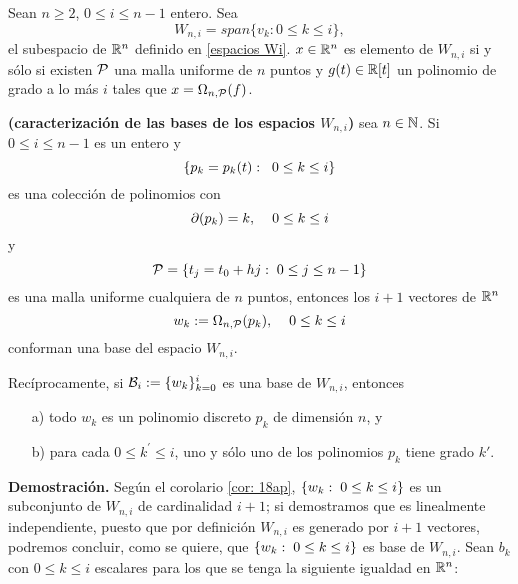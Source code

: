 \begin{cor}
\label{cor: 18ap}
Sean $n\geq 2$, $0 \leq i \leq n-1$ entero. 
Sea
\begin{equation*}
\label{def de espacios Wk}
W_{n,i}= span\{ v_{k} : 0 \leq k \leq i \},
\end{equation*}
el subespacio de $\mathbb{R}^{n}$ 
definido en \eqref{espacios Wi}.
$x \in \mathbb{R}^{n}$ es elemento de $W_{n,i}$ si y sólo si 
existen $\mathcal{P}$ una malla uniforme de $n$ puntos y
$g(t) \in \mathbb{R}[t]$ un polinomio de grado a lo más $i$
tales que 
$x = \Omega_{n, \mathcal{P}}(f)$.
\end{cor}


\begin{prop} \label{Teorema1}
\textbf{(caracterización de las bases
de los espacios $W_{n,i}$)} sea $n \in \mathbb{N}$.
Si $0 \leq i \leq n-1$ es un entero y
\[
\{ p_{k}=p_{k}(t): \hspace{0.2cm} 0 \leq k \leq i \}
\]
es una colección de polinomios con
\[
\partial (p_{k})=k, \hspace{0.4cm} 0 \leq k \leq i
\]
y 
\[
\mathcal{P}= \{ t_{j}= t_{0}+hj :\hspace{0.1cm} 0 \leq j \leq n-1 \}
\]
es una malla uniforme cualquiera
de $n$ puntos, entonces los $i+1$ vectores
de $\mathbb{R}^{n}$
\begin{equation}
\label{eq1: 30Oct}
w_{k} := \Omega_{n, \mathcal{P}}(p_{k}), \hspace{0.4cm} 0 \leq k \leq i
\end{equation}
conforman una base del espacio $W_{n,i}$.

Recíprocamente, si $\mathcal{B}_{i} := \{ w_{k} \}_{k=0}^{i}$
es una base de $W_{n,i}$, entonces 
\begin{itemize}
	\item[a)] todo $w_{k}$ es un polinomio discreto $p_{k}$ de dimensión $n$, y
	\item[b)] para cada $0 \leq k^{'} \leq i$, uno y sólo uno de los polinomios
	$p_{k}$ tiene grado $k'$.
\end{itemize}
\end{prop}
\noindent
\textbf{Demostración.}
Según el corolario \ref{cor: 18ap}, 
$\{ w_{k}: \hspace{0.1cm} 0 \leq k \leq i \}$
es un subconjunto de $W_{n,i}$ de cardinalidad $i+1$; 
si demostramos que es 
linealmente independiente, puesto que por definición
$W_{n,i}$ es generado por $i+1$ vectores, podremos concluir,
como se quiere, que $\{ w_{k}: \hspace{0.1cm} 0 \leq k \leq i \}$
es base de $W_{n,i}$.
Sean $b_{k}$ con $0 \leq k \leq i$ escalares
para los que se tenga la siguiente igualdad en $\mathbb{R}^{n}$:

